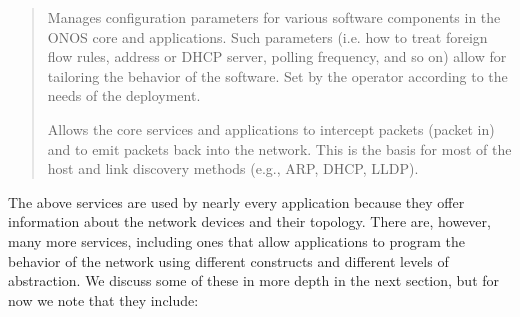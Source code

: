 \documentclass[letterpaper,11pt,english]{sphinxmanual}
\begin{document}
\begin{quote}
 Manages configuration parameters for various
software components in the ONOS core and applications. Such
parameters (i.e. how to treat foreign flow rules, address or DHCP
server, polling frequency, and so on) allow for tailoring the
behavior of the software. Set by the operator according to the needs of
the deployment.

 Allows the core services and applications to intercept
packets (packet in) and to emit packets back into the network. This
is the basis for most of the host and link discovery methods (e.g.,
ARP, DHCP, LLDP).
\end{quote}

The above services are used by nearly every application because they
offer information about the network devices and their topology. There
are, however, many more services, including ones that allow
applications to program the behavior of the network using different
constructs and different levels of abstraction. We discuss some of
these in more depth in the next section, but for now we note that they
include:
\end{document}
